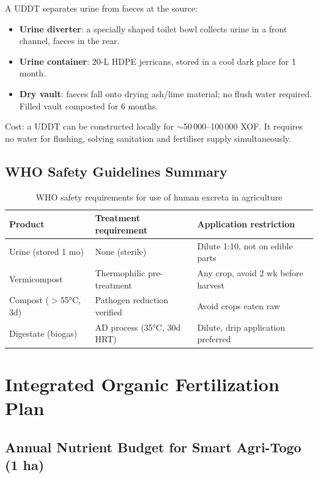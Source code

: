 \documentclass[12pt,a4paper,openany]{book}
\begin{document}
A UDDT separates urine from faeces at the source:
\begin{itemize}[leftmargin=2em]
  \item \textbf{Urine diverter}: a specially shaped toilet bowl collects urine in a front channel, faeces in the rear.
  \item \textbf{Urine container}: 20-L HDPE jerricans, stored in a cool dark place for 1 month.
  \item \textbf{Dry vault}: faeces fall onto drying ash/lime material; no flush water required. Filled vault composted for 6 months.
\end{itemize}
Cost: a UDDT can be constructed locally for $\sim$50\,000--100\,000 XOF. It requires no water for flushing, solving sanitation and fertiliser supply simultaneously.

\section{WHO Safety Guidelines Summary}

\begin{table}[H]
\centering
\caption{WHO safety requirements for use of human excreta in agriculture}
\renewcommand{\arraystretch}{1.3}
\begin{tabular}{lll}
\toprule
\textbf{Product}&\textbf{Treatment requirement}&\textbf{Application restriction}\\
\midrule
Urine (stored 1 mo) & None (sterile) & Dilute 1:10, not on edible parts\\
Vermicompost & Thermophilic pre-treatment & Any crop, avoid 2 wk before harvest\\
Compost ($>$55°C, 3d) & Pathogen reduction verified & Avoid crops eaten raw\\
Digestate (biogas) & AD process (35°C, 30d HRT) & Dilute, drip application preferred\\
\bottomrule
\end{tabular}
\end{table}

\chapter{Integrated Organic Fertilization Plan}
\label{chap:fert_plan}

\section{Annual Nutrient Budget for Smart Agri-Togo (1 ha)}
\end{document}
